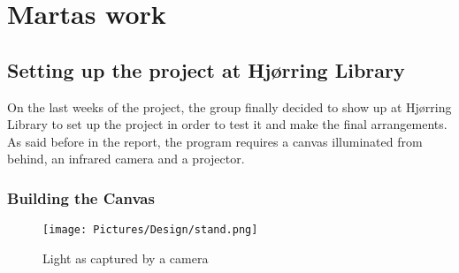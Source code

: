 \chapter{Martas work}

\section{Setting up the project at Hj{\o}rring Library}
On the last weeks of the project, the group finally decided to show up at Hj{\o}rring Library to set up the project in order to test it and make the final arrangements. As said before in the report, the program requires a canvas illuminated from behind, an infrared camera and a projector.
\subsection{Building the Canvas}

\begin{figure}[htbp] 
\centering 
\texttt{[image: Pictures/Design/stand.png]} 
\caption{Light as captured by a camera} 
\label{fig:standPosition} 
\end{figure}

